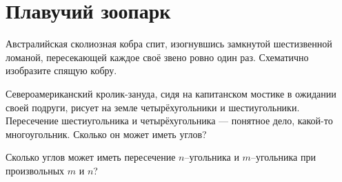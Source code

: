 \section{Плавучий зоопарк}

\begin{itemize}
 Австралийская сколиозная кобра спит, изогнувшись замкнутой шестизвенной ломаной, пересекающей каждое своё звено ровно один раз. Схематично изобразите спящую кобру.

\itB Североамериканский кролик-зануда, сидя на капитанском мостике в ожидании своей подруги, рисует на земле четырёхугольники и шестиугольники. Пересечение шестиугольника и четырёхугольника — понятное дело, какой-то многоугольник. Сколько он может иметь углов?

\itC Сколько углов может иметь пересечение $n$--угольника и $m$--угольника при произвольных $m$ и $n$?
\end{itemize}